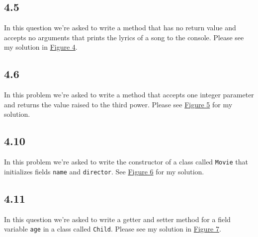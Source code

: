 \documentclass[leqno, 11pt]{article}
\newcommand{\iftcodefigure}[3]{%
  \begin{codefigure}
    \label{#1}
    \addtocounter{figure}{-1}
    
  \end{codefigure}
}
\begin{document}
\subsection{4.5}
In this question we're asked to write a method that has no return value and accepts no arguments that prints the lyrics of a song to the console. Please see my solution in \hyperref[fig:four]{Figure 4}.
\iftcodefigure{fig:four}{Lyrics.java}{%
  /home/brandon/eclipse-workspace/ift_194_hw/src/hw_3/Lyrics.java}
\subsection{4.6}
In this problem we're asked to write a method that accepts one integer parameter and returns the value raised to the third power. Please see \hyperref[fig:five]{Figure 5} for my solution.
\iftcodefigure{fig:five}{Cube.java}{%
  /home/brandon/eclipse-workspace/ift_194_hw/src/hw_3/Cube.java}
\subsection{4.10}
In this problem we're asked to write the constructor of a class called \texttt{Movie} that initializes fields \texttt{name} and \texttt{director}. See \hyperref[fig:six]{Figure 6} for my solution.
\iftcodefigure{fig:six}{Movie.java}{%
  /home/brandon/eclipse-workspace/ift_194_hw/src/hw_3/Movie.java}
\subsection{4.11}
In this question we're asked to write a getter and setter method for a field variable \texttt{age} in a class called \texttt{Child}. Please see my solution in \hyperref[fig:seven]{Figure 7}.
\iftcodefigure{fig:seven}{Child.java}{%
  /home/brandon/eclipse-workspace/ift_194_hw/src/hw_3/Child.java}
\end{document}
